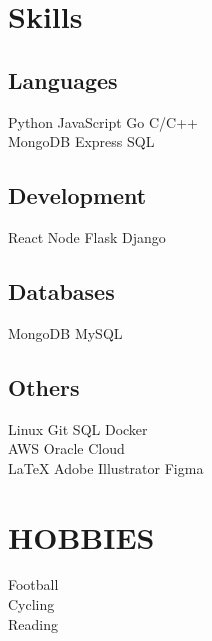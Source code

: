 \documentclass[]{resume}
\begin{document}
\begin{minipage}[t]{0.33\textwidth}

\bigskip

\section{Skills}
\subsection{Languages}
Python \textbullet{} JavaScript \textbullet{} Go \textbullet{} C/C++ \\
MongoDB \textbullet{} Express \textbullet{}   SQL  \\
\bigskip

\subsection{Development}
React \textbullet{} Node \textbullet{} Flask \textbullet{} Django \\
\sectionsep

\subsection{Databases}
MongoDB \textbullet{} MySQL \\
\sectionsep

\subsection{Others}
Linux \textbullet{} Git \textbullet{} SQL \textbullet{} Docker \\  
AWS \textbullet{} Oracle Cloud \\
\LaTeX \textbullet{} Adobe Illustrator \textbullet{} Figma \\
\sectionsep

\bigskip


\section{HOBBIES}
Football\\
Cycling\\
Reading\\

\sectionsep
\bigskip


\end{minipage}
\end{document}
